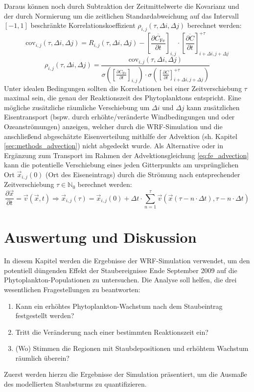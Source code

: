 \documentclass[12pt,a4paper,onecolumn]{scrartcl}
\begin{document}
Daraus können noch durch Subtraktion der Zeitmittelwerte die Kovarianz und der durch Normierung um die zeitlichen Standardabweichung auf das Intervall $[-1,1]$ beschränkte Korrelationskoeffizient $\rho_{i,j}(\tau,\Delta i, \Delta j)$ berechnet werden:
\begin{equation}
\text{cov}_{i,j}(\tau,\Delta i, \Delta j) = R_{i,j}(\tau,\Delta i, \Delta j)-\left[\frac{\overline{\partial C_\text{Fe}}}{\partial t}\right]_{i,j} \cdot \left[\frac{\overline{\partial C}}{\partial t}\right]_{i+\Delta i,j+\Delta j}^{+\tau}
\end{equation}
\begin{equation}
\rho_{i,j}(\tau,\Delta i, \Delta j) = \frac{\text{cov}_{i,j}(\tau,\Delta i, \Delta j)}{\sigma \left(\left[\frac{\partial C_\text{Fe}}{\partial t}\right]_{i,j}\right) \cdot \sigma\left(\left[\frac{\partial C}{\partial t}\right]_{i+\Delta i ,j+\Delta j}^{+\tau}\right)}
\end{equation}
Unter idealen Bedingungen sollten die Korrelationen bei einer Zeitverschiebung $\tau$ maximal sein, die genau der Reaktionszeit des Phytoplanktons entspricht. Eine mögliche zusätzliche räumliche Verschiebung um $\Delta i$ und $\Delta j$ kann zusätzlichen Eisentransport (bspw. durch erhöhte/veränderte Windbedingungen und oder Ozeanströmungen) anzeigen, welcher durch die WRF-Simulation und die anschließend abgeschätzte Eisenverteilung mithilfe der Advektion (sh. Kapitel \ref{sec:methods_advection}) nicht abgedeckt wurde. Als Alternative oder in Ergänzung zum Transport im Rahmen der Advektionsgleichung \ref{eq:fe_advection} kann die potentielle Verschiebung eines jeden Gitterpunkts am ursprünglichen Ort $\vec{x}_{i,j}(0)$ (Ort des Eiseneintrags) durch die Strömung nach entsprechender Zeitverschiebung $\tau \in \mathbb{N}_0$ berechnet werden:
\begin{equation}
\frac{\partial \vec{x}}{\partial t} = \vec{v}(\vec{x},t) \Rightarrow \vec{x}_{i,j}(\tau) =   \vec{x}_{i,j}(0) + \Delta t \cdot \sum\limits_{n = 1}^{\tau} \vec{v} \left( \vec{x}(\tau - n \cdot \Delta t),\tau - n \cdot \Delta t \right)
\end{equation}
\section{Auswertung und Diskussion} \label{sec:auswertung}
In diesem Kapitel werden die Ergebnisse der WRF-Simulation verwendet, um den potentiell düngenden Effekt der Staubereignisse Ende September 2009 auf die Phytoplankton-Populationen zu untersuchen. Die Analyse soll helfen, die drei wesentlichen Fragestellungen zu beantworten:
\begin{enumerate}
\item Kann ein erhöhtes Phytoplankton-Wachstum nach dem Staubeintrag festgestellt werden?
\item Tritt die Veränderung nach einer bestimmten Reaktionszeit ein?
\item (Wo) Stimmen die Regionen mit Staubdepositionen und erhöhtem Wachstum räumlich überein?
\end{enumerate}
Zuerst werden hierzu die Ergebnisse der Simulation präsentiert, um die Ausmaße des modellierten Staubsturms zu quantifizieren. 
\end{document}
